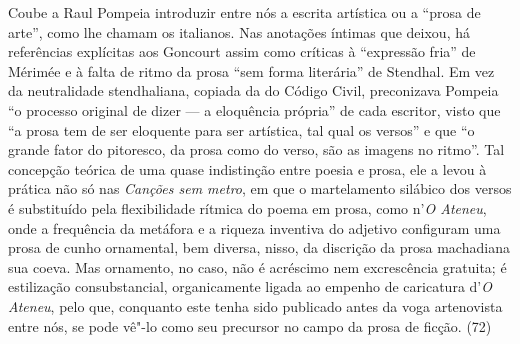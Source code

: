 Coube a Raul Pompeia introduzir entre nós a escrita
artística ou a ``prosa de arte'', como lhe chamam os italianos. Nas
anotações íntimas que deixou, há referências explícitas aos Goncourt
assim como críticas à ``expressão fria'' de Mérimée e à falta de ritmo
da prosa ``sem forma literária'' de Stendhal. Em vez da neutralidade
stendhaliana, copiada da do Código Civil, preconizava Pompeia ``o
processo original de dizer --- a eloquência própria'' de cada escritor,
visto que ``a prosa tem de ser eloquente para ser artística, tal qual os
versos'' e que ``o grande fator do pitoresco, da prosa como do verso, são
as imagens no ritmo''. Tal concepção teórica de uma quase indistinção 
entre poesia e prosa, ele a levou à prática não só nas
\textit{Canções sem metro}, em que o
martelamento silábico dos versos é substituído pela flexibilidade
rítmica do poema em prosa, como n'\textit{O Ateneu}, 
onde a frequência da metáfora e a riqueza
inventiva do adjetivo configuram uma prosa de cunho ornamental, bem
diversa, nisso, da discrição da prosa machadiana sua coeva. Mas
ornamento, no caso, não é acréscimo nem excrescência gratuita; é
estilização consubstancial, organicamente ligada ao empenho de
caricatura d'\textit{O Ateneu}, pelo que,
conquanto este tenha sido publicado antes da voga artenovista entre
nós, se pode vê"-lo como seu precursor no campo da prosa de ficção.
(72)



